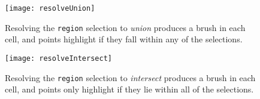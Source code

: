 \begin{figure}[h!]
  \centering
  \texttt{[image: resolveUnion]}
  \caption{Resolving the \texttt{region} selection to \emph{union}
produces a brush in each cell, and points highlight if they fall within any of
the selections.}
  \label{fig:vl:resolveUnion}
\end{figure}

\begin{figure}[h!]
  \centering
  \texttt{[image: resolveIntersect]}
  \caption{Resolving the \texttt{region} selection to \emph{intersect}
produces a brush in each cell, and points only highlight if they lie within all
of the selections.}
  \label{fig:vl:resolveIntersect}
\end{figure}